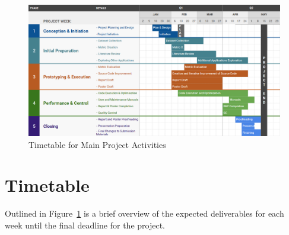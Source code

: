 \documentclass[a4paper,12pt]{article}
\begin{document}
\begin{figure}[htb!]
\begin{center}
\includegraphics[width=\textwidth]{plan.png}
\caption{Timetable for Main Project Activities \label{fig:plan}}
\end{center}
\end{figure}

\section*{Timetable}
Outlined in Figure~\ref{fig:plan} is a brief overview of the expected deliverables for each week until the final deadline for the project.



\end{document}
